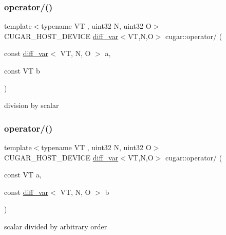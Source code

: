 \subsubsection{\texorpdfstring{operator/()}{operator/()}\hspace{0.1cm}{\footnotesize\ttfamily [2/3]}}
{\footnotesize\ttfamily template$<$typename VT , uint32 N, uint32 O$>$ \\
C\+U\+G\+A\+R\+\_\+\+H\+O\+S\+T\+\_\+\+D\+E\+V\+I\+CE \hyperlink{structcugar_1_1diff__var}{diff\+\_\+var}$<$VT,N,O$>$ cugar\+::operator/ (\begin{DoxyParamCaption}\item[{const \hyperlink{structcugar_1_1diff__var}{diff\+\_\+var}$<$ VT, N, O $>$}]{a,  }\item[{const VT}]{b }\end{DoxyParamCaption})\hspace{0.3cm}{\ttfamily [inline]}}

division by scalar \mbox{\label{group___auto_diff_module_gac6d06651e3bd3b22fa763498852053dd}} 
\subsubsection{\texorpdfstring{operator/()}{operator/()}\hspace{0.1cm}{\footnotesize\ttfamily [3/3]}}
{\footnotesize\ttfamily template$<$typename VT , uint32 N, uint32 O$>$ \\
C\+U\+G\+A\+R\+\_\+\+H\+O\+S\+T\+\_\+\+D\+E\+V\+I\+CE \hyperlink{structcugar_1_1diff__var}{diff\+\_\+var}$<$VT,N,O$>$ cugar\+::operator/ (\begin{DoxyParamCaption}\item[{const VT}]{a,  }\item[{const \hyperlink{structcugar_1_1diff__var}{diff\+\_\+var}$<$ VT, N, O $>$}]{b }\end{DoxyParamCaption})\hspace{0.3cm}{\ttfamily [inline]}}

scalar divided by arbitrary order \mbox{\label{group___auto_diff_module_ga3b4318e910a931b341f25f7918f98ec3}} 
